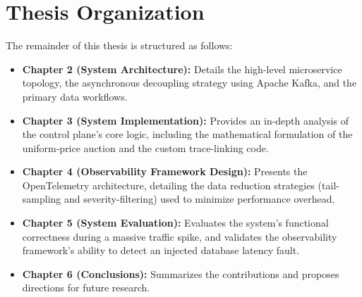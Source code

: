 \section{Thesis Organization}

The remainder of this thesis is structured as follows:
\begin{itemize}
    \item \textbf{Chapter 2 (System Architecture):} Details the high-level microservice topology, the asynchronous decoupling strategy using Apache Kafka, and the primary data workflows.
    \item \textbf{Chapter 3 (System Implementation):} Provides an in-depth analysis of the control plane's core logic, including the mathematical formulation of the uniform-price auction and the custom trace-linking code.
    \item \textbf{Chapter 4 (Observability Framework Design):} Presents the OpenTelemetry architecture, detailing the data reduction strategies (tail-sampling and severity-filtering) used to minimize performance overhead.
    \item \textbf{Chapter 5 (System Evaluation):} Evaluates the system's functional correctness during a massive traffic spike, and validates the observability framework's ability to detect an injected database latency fault.
    \item \textbf{Chapter 6 (Conclusions):} Summarizes the contributions and proposes directions for future research.
\end{itemize}